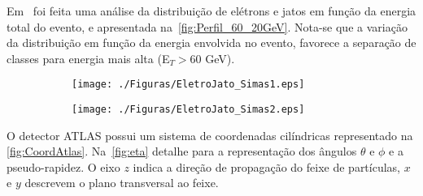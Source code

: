 Em~  foi feita uma análise da distribuição de elétrons e jatos em função da energia total do evento, e apresentada na~\autoref{fig:Perfil_60_20GeV}. Nota-se que a variação da distribuição em função da energia envolvida no evento, favorece a separação de classes para energia mais alta (E$_T>$60 GeV).

\begin{figure}[H]
	\caption{Distribuição elétrons e jatos em função da energia total do evento. }\label{fig:Perfil_60_20GeV}
	\begin{subfigure}[t]{.5\linewidth}
		\centering
		\label{fig:Perfil_20GeV}
		\texttt{[image: ./Figuras/EletroJato\_Simas1.eps]}
	\end{subfigure}
	\begin{subfigure}[t]{.5\linewidth}
		\centering
		\label{fig:Perfil_60GeV}
		\texttt{[image: ./Figuras/EletroJato\_Simas2.eps]}
	\end{subfigure}
\end{figure}

O detector ATLAS possui um sistema de coordenadas cilíndricas representado na \autoref{fig:CoordAtlas}. Na~\autoref{fig:eta} detalhe para a representação dos ângulos $\theta$ e $\phi$ e a pseudo-rapidez. O eixo $z$ indica a direção de propagação do feixe de partículas, $x$ e $y$ descrevem o plano transversal ao feixe. 

%

